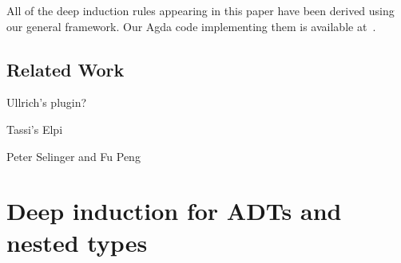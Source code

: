 \documentclass[9pt]{entcs}
\begin{document}
All of the deep induction rules appearing in this paper have been
derived using our general framework. Our Agda code implementing them
is available at~\cite{web-page}.

\subsection{Related Work}

Ullrich's plugin?

Tassi's Elpi

Peter Selinger and  Fu Peng

\section{Deep induction for ADTs and nested types}\label{sec:ADTs-and-nesteds}
\end{document}
